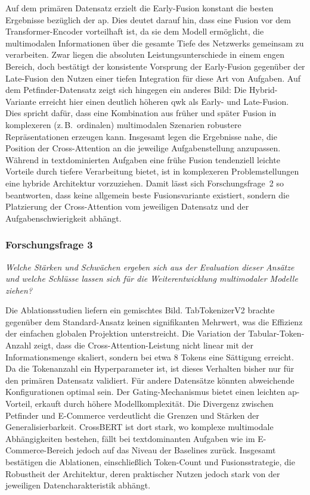 Auf dem primären Datensatz erzielt die Early-Fusion konstant die besten Ergebnisse bezüglich der \Gls{ap}. Dies deutet darauf hin, dass eine Fusion vor dem Transformer-Encoder vorteilhaft ist, da sie dem Modell ermöglicht, die multimodalen Informationen über die gesamte Tiefe des Netzwerks gemeinsam zu verarbeiten. Zwar liegen die absoluten Leistungsunterschiede in einem engen Bereich, doch bestätigt der konsistente Vorsprung der Early-Fusion gegenüber der Late-Fusion den Nutzen einer tiefen Integration für diese Art von Aufgaben. Auf dem Petfinder-Datensatz zeigt sich hingegen ein anderes Bild: Die Hybrid-Variante erreicht hier einen deutlich höheren \Gls{qwk} als Early- und Late-Fusion. Dies spricht dafür, dass eine Kombination aus früher und später Fusion in komplexeren (z.\,B.\ ordinalen) multimodalen Szenarien robustere Repräsentationen erzeugen kann. Insgesamt legen die Ergebnisse nahe, die Position der Cross-Attention an die jeweilige Aufgabenstellung anzupassen. Während in textdominierten Aufgaben eine frühe Fusion tendenziell leichte Vorteile durch tiefere Verarbeitung bietet, ist in komplexeren Problemstellungen eine hybride Architektur vorzuziehen. Damit lässt sich Forschungsfrage~2 so beantworten, dass keine allgemein beste Fusionsvariante existiert, sondern die Platzierung der Cross-Attention vom jeweiligen Datensatz und der Aufgabenschwierigkeit abhängt.

\newpage
\subsubsection*{Forschungsfrage 3}
\textit{Welche Stärken und Schwächen ergeben sich aus der Evaluation dieser Ansätze und welche Schlüsse lassen sich für die Weiterentwicklung multimodaler Modelle ziehen?}

Die Ablationsstudien liefern ein gemischtes Bild. TabTokenizerV2 brachte gegenüber dem Standard-Ansatz keinen signifikanten Mehrwert, was die Effizienz der einfachen globalen Projektion unterstreicht. Die Variation der Tabular-Token-Anzahl zeigt, dass die Cross-Attention-Leistung nicht linear mit der Informationsmenge skaliert, sondern bei etwa 8 Tokens eine Sättigung erreicht. Da die Tokenanzahl ein Hyperparameter ist, ist dieses Verhalten bisher nur für den primären Datensatz validiert. Für andere Datensätze könnten abweichende Konfigurationen optimal sein. Der Gating-Mechanismus bietet einen leichten \Gls{ap}-Vorteil, erkauft durch höhere Modellkomplexität. Die Divergenz zwischen Petfinder und E-Commerce verdeutlicht die Grenzen und Stärken der Generalisierbarkeit. CrossBERT ist dort stark, wo komplexe multimodale Abhängigkeiten bestehen, fällt bei textdominanten Aufgaben wie im E-Commerce-Bereich jedoch auf das Niveau der Baselines zurück. Insgesamt bestätigen die Ablationen, einschließlich Token-Count und Fusionsstrategie, die Robustheit der Architektur, deren praktischer Nutzen jedoch stark von der jeweiligen Datencharakteristik abhängt.

